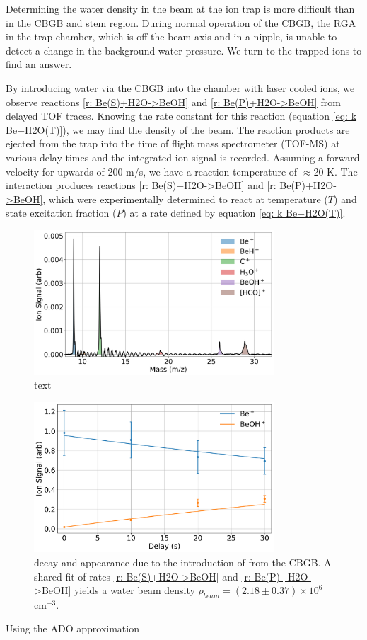 Determining the water density in the beam at the ion trap is more difficult than in the CBGB and stem region. During normal operation of the CBGB, the RGA in the trap chamber, which is off the beam axis and in a nipple, is unable to detect a change in the background water pressure. We turn to the trapped ions to find an answer.

By introducing water via the CBGB into the chamber with laser cooled  ions, we observe reactions \ref{r: Be(S)+H2O->BeOH} and \ref{r: Be(P)+H2O->BeOH} from delayed TOF traces. Knowing the rate constant for this reaction (equation \ref{eq: k Be+H2O(T)}), we may find the density of the beam. The reaction products are ejected from the trap into the time of flight mass spectrometer (TOF-MS) at various delay times and the integrated ion signal is recorded. Assuming a forward velocity for  upwards of 200 m/s, we have a reaction temperature of $\approx$20 K. The interaction produces reactions \ref{r: Be(S)+H2O->BeOH} and \ref{r: Be(P)+H2O->BeOH}, which were experimentally determined to react at temperature ($T$) and  state excitation fraction ($P$) at a rate defined by equation \ref{eq: k Be+H2O(T)}.

\begin{figure}[H]
	\centering
	\includegraphics[width=0.8\textwidth]{images/C_H2O_beam_TOF.png}
	\caption{text}
	\label{fig: Be C H2O beam TOF}
\end{figure}

\begin{figure}[H]
	\centering
	\includegraphics[width=0.8\textwidth]{images/Be_H2O_beam_traces.png}
	\caption{ decay and  appearance due to the introduction of  from the CBGB. A shared fit of rates \ref{r: Be(S)+H2O->BeOH} and \ref{r: Be(P)+H2O->BeOH} yields a water beam density $\rho_{beam} = (2.18 \pm 0.37) \times 10^6$ cm$^{-3}$.}
	\label{fig: Be H2O beam}
\end{figure}

Using the ADO approximation

